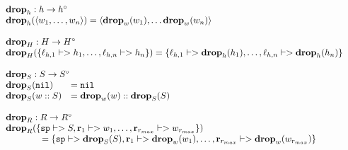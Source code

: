 {\[\begin{array}{l}
\begin{array}{l}
\mathbf{drop}_h : h -> h^\circ \\
\drop{h}{\langle w_1, \dots, w_n \rangle} = \langle \drop{w}{w_1}, \dots \drop{w}{w_n}\rangle \\\\

\mathbf{drop}_H : H -> H^\circ \\
\drop{H}{\{\ell_{h,1} |-> h_1, \dots, \ell_{h,n} |-> h_n\}} = \{\ell_{h,1} |-> \drop{h}{h_1}, \dots, \ell_{h,n} |-> \drop{h}{h_n}\}
\end{array} \\\\

\begin{array}{ll}
\rlap{$\mathbf{drop}_S : S -> S^\circ$} \\
\drop{S}{\mathtt{nil}} &= \mathtt{nil} \\
\drop{S}{w :: S} &= \drop{w}{w} :: \drop{S}{S} \\
\end{array} \\\\

\begin{array}{l}
\mathbf{drop}_R : R -> R^\circ \\
\drop{R}{\{\mathtt{sp} |-> S, \mathbf{r}_1 |-> w_1, \dots, \mathbf{r}_{r_{max}} |-> w_{r_{max}}\}}\\
\quad\quad\quad\quad = \{\mathtt{sp} |-> \drop{S}{S}, \mathbf{r}_1 |-> \drop{w}{w_1}, \dots, \mathbf{r}_{r_{max}} |-> \drop{w}{w_{r_{max}}}\}
\end{array} \\\\


\end{array}\]}
